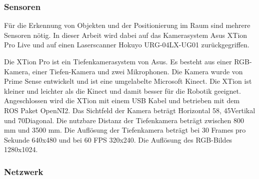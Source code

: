\subsubsection{Sensoren}
Für die Erkennung von Objekten und der Positionierung im Raum sind mehrere Sensoren nötig. In dieser Arbeit wird dabei auf das Kamerasystem Asus XTion Pro Live und auf einen Laserscanner Hokuyo URG-04LX-UG01 zurückgegriffen.

Die XTion Pro ist ein Tiefenkamerasystem von Asus. Es besteht aus einer RGB-Kamera, einer Tiefen-Kamera und zwei Mikrophonen. Die Kamera wurde von Prime Sense entwickelt und ist eine umgelabelte Microsoft Kinect. Die XTion ist kleiner und leichter als die Kinect und damit besser für die Robotik geeignet. Angeschlossen wird die XTion mit einem USB Kabel und betrieben mit dem ROS Paket OpenNI2. Das Sichtfeld der Kamera beträgt Horizontal 58\textdegree, 45\textdegree Vertikal und 70\textdegree Diagonal. Die nutzbare Distanz der Tiefenkamera beträgt zwischen 800 mm und 3500 mm. Die Auflösung der Tiefenkamera beträgt bei 30 Frames pro Sekunde 640x480 und bei 60 FPS 320x240. Die Auflösung des RGB-Bildes 1280x1024. 

\subsubsection{Netzwerk}